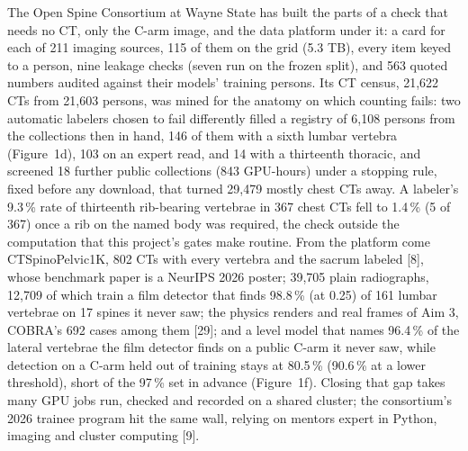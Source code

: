 \documentclass[10pt,letterpaper]{article}
\newcommand{\pct}{\,\%}
\begin{document}
The Open Spine Consortium at Wayne State has built the parts of a check that needs no CT, only the C-arm image, and
the data platform under it: a card for each of 211 imaging sources, 115 of them on the grid (5.3 TB), every item keyed to a person, nine leakage checks (seven run on the frozen split), and 563 quoted numbers audited against their models' training persons. Its CT census, 21,622 CTs from 21,603 persons, was mined for the anatomy on which counting fails: two automatic labelers chosen to fail differently filled a registry of 6,108 persons from the collections then in hand, 146 of them with a sixth lumbar vertebra (Figure~1d), 103 on an expert read, and 14 with a thirteenth thoracic, and screened 18 further public collections (843 GPU-hours) under a stopping rule, fixed before any download, that turned 29,479 mostly chest CTs away. A labeler's 9.3\pct{} rate of thirteenth rib-bearing vertebrae in 367 chest CTs fell to 1.4\pct{} (5 of 367) once a rib on the named body was required, the check outside the computation that this project's gates make routine. From the platform come CTSpinoPelvic1K, 802 CTs with every vertebra and the sacrum labeled [8],
whose benchmark paper is a NeurIPS 2026 poster; 39,705 plain radiographs, 12,709 of which train a film detector that
finds 98.8\pct{} (at 0.25) of 161 lumbar vertebrae on 17 spines it never saw; the physics renders and real frames of Aim 3,
COBRA's 692 cases among them [29]; and a level model that names 96.4\pct{} of the lateral vertebrae the
film detector finds on a public C-arm it never saw, while detection on a C-arm held out of training stays
at 80.5\pct{} (90.6\pct{} at a lower threshold), short of the 97\pct{} set in advance (Figure~1f). Closing that gap takes many GPU jobs run, checked and recorded on a shared cluster; the
consortium's 2026 trainee program hit the same wall, relying on mentors expert in Python, imaging and cluster
computing [9].
\end{document}
